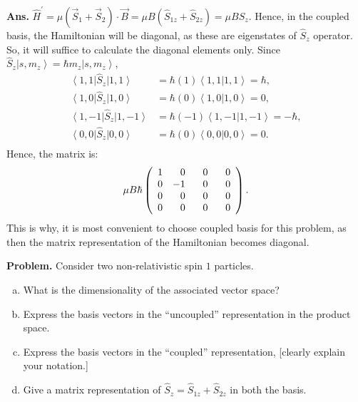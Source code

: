 \documentclass[12pt]{article}
\newcommand\lr{\left \langle}
\newcommand\rr{\right \rangle}
\newcommand\ls{\left |}
\newcommand\rs{\right |}
\newcommand\hs{\hat{S}}
\begin{document}
\begin{enumerate}[1.]
\begin{enumerate}[I.]
        \end{enumerate}
\textbf{Ans.} $\hat{H}^{'} = \mu \left ( \vec{S}_1 + \vec{S}_2 \right ) \cdot \vec{B} = \mu B \left(\hs_{1z} + \hs_{2z} \right) = \mu B \hs_z$. Hence, in the coupled basis, the Hamiltonian will be diagonal, as these are eigenstates of $\hs_z$ operator. So, it will suffice to calculate the diagonal elements only. Since $\hs_z \ls s, m_z \rr = \hbar m_z \ls s, m_z \rr$,
$$
\begin{aligned}
\lr 1, 1 \rs \hs_z \ls 1, 1 \rr & = \hbar (1)\lr 1, 1 \rs \left. 1, 1 \rr = \hbar, \\
\lr 1, 0 \rs \hs_z \ls 1, 0 \rr & = \hbar (0) \lr 1, 0 \rs \left. 1, 0 \rr = 0, \\
\lr 1, -1 \rs \hs_z \ls 1, -1 \rr & = \hbar (-1)\lr 1, -1 \rs \left. 1, -1 \rr = -\hbar, \\
\lr 0, 0 \rs \hs_z \ls 0, 0 \rr & = \hbar (0)\lr 0, 0 \rs \left. 0, 0 \rr = 0. \\
\end{aligned}
$$
Hence, the matrix is: $$\mu B \hbar \left( \begin{array}{crrr}
              1 & 0 & 0 & 0 \\
              0 & -1 & \hphantom{-}0 & \hphantom{-}0 \\
              0 & 0 & 0 & 0 \\
              0 & 0 & 0 & 0 \\
              \end{array} \right). $$
This is why, it is most convenient to choose coupled basis for this problem, as then the matrix representation of the Hamiltonian becomes diagonal.
\end{enumerate}
\textbf{Problem.} Consider two non-relativistic spin $1$ particles.
\begin{enumerate}[(a)]
\item What is the dimensionality of the associated vector space?
\item Express the basis vectors in the ``uncoupled'' representation in the product space.
\item Express the basis vectors in the ``coupled'' representation, [clearly explain your notation.]
\item Give a matrix representation of $\hs_z = \hs_{1z} + \hs_{2z}$ in both the basis.
\end{enumerate}
\end{document}
